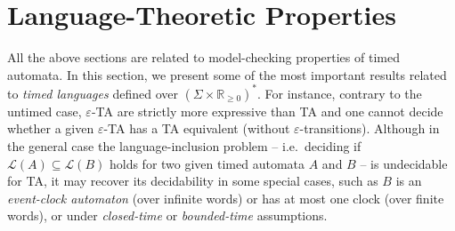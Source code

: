 \documentclass[11pt]{article}
\theoremstyle{definition}
\theoremstyle{remark}
\theoremstyle{definition}
\begin{document}
\section{Language-Theoretic Properties}\label{sec:lang}
All the above sections are related to model-checking properties of timed automata.
In this section, we present some of the most important results related to \emph{timed languages} defined over $(\Sigma \times \mathbb{R}_{\geq 0})^*$.
For instance, contrary to the untimed case, $\varepsilon$-TA are strictly more expressive than TA and one cannot decide whether a given $\varepsilon$-TA has a TA equivalent (without $\varepsilon$-transitions).
Although in the general case the language-inclusion problem -- i.e.\ deciding if $\mathcal{L}(A) \subseteq \mathcal{L}(B)$ holds for two given timed automata $A$ and $B$ -- is undecidable for TA, it may recover its decidability in some special cases, such as $B$ is an \emph{event-clock automaton} (over infinite words) or has at most one clock (over finite words), or under \emph{closed-time} or \emph{bounded-time} assumptions.



\end{document}
